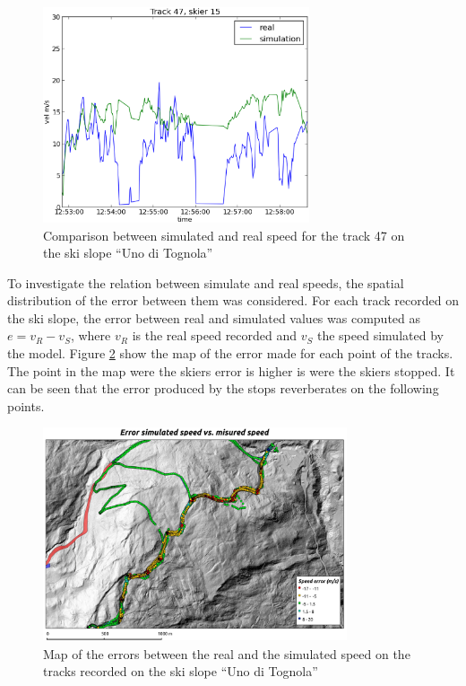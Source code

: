 \documentclass[12pt,a4paper,twoside]{book}
\begin{document}
\begin{figure}[!b]
  \begin{center}
    \includegraphics[width=0.7\textwidth]{images/sm_track47.eps}
    \caption{Comparison between simulated and real speed for the track 47 on the ski slope ``Uno di Tognola''}\label{sm_track47}
  \end{center}
\end{figure}

To investigate the relation between simulate and real speeds, the spatial distribution of the error between them was considered. For each track recorded on the ski slope, the error between real and simulated values was computed as $e=v_R-v_S$, where $v_R$ is the real speed recorded and $v_S$ the speed simulated by the model. Figure \ref{map_error} show the map of the error made for each point of the tracks. The point in the map were the skiers error is higher is were the skiers stopped. It can be seen that the error produced by the stops reverberates on the following points.

\begin{figure}
  \centering
    \includegraphics[width=0.8\textwidth]{images/map_error.eps}
    \caption{Map of the errors between the real and the simulated speed on the tracks recorded on the ski slope ``Uno di Tognola''}\label{map_error}
\end{figure}
\end{document}
